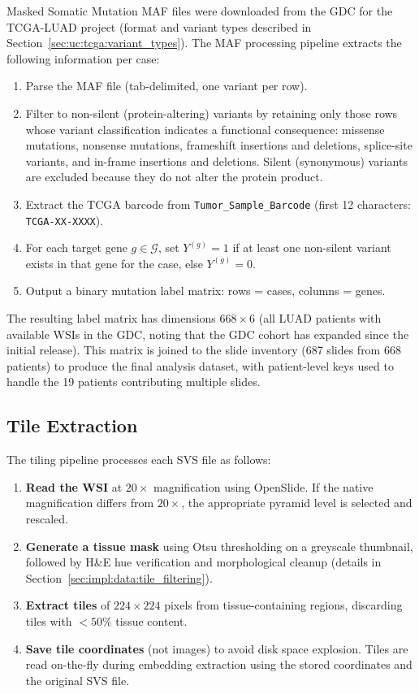 Masked Somatic Mutation MAF files were downloaded from the GDC for the
TCGA-LUAD project (format and variant types described in
Section~\ref{sec:uc:tcga:variant_types}).
The MAF processing pipeline
extracts the following information per case:

\begin{enumerate}
    \item Parse the MAF file (tab-delimited, one variant per row).
    \item Filter to non-silent (protein-altering) variants by retaining
    only those rows whose variant classification indicates a functional
    consequence: missense mutations, nonsense mutations, frameshift
    insertions and deletions, splice-site variants, and in-frame
    insertions and deletions.  Silent (synonymous) variants are
    excluded because they do not alter the protein product.
    \item Extract the TCGA barcode from \texttt{Tumor\_Sample\_Barcode}
    (first 12 characters: \texttt{TCGA-XX-XXXX}).
    \item For each target gene $g \in \mathcal{G}$, set $Y^{(g)} = 1$ if
    at least one non-silent variant exists in that gene for the case,
    else $Y^{(g)} = 0$.
    \item Output a binary mutation label matrix: rows = cases, columns
    = genes.
\end{enumerate}

The resulting label matrix has dimensions $668 \times 6$
(all LUAD patients with available WSIs in the GDC, noting that the
GDC cohort has expanded since the initial release).
This matrix is joined to the slide inventory (687 slides from 668 patients)
to produce the final analysis dataset, with patient-level keys used to
handle the 19 patients contributing multiple slides.

\subsection{Tile Extraction}
\label{sec:impl:data:tiling}

The tiling pipeline processes each SVS file as follows:

\begin{enumerate}
    \item \textbf{Read the WSI} at $20\times$ magnification using OpenSlide.
    If the native magnification differs from $20\times$, the appropriate
    pyramid level is selected and rescaled.
    \item \textbf{Generate a tissue mask} using Otsu thresholding on a
    greyscale thumbnail, followed by H\&E hue verification and
    morphological cleanup (details in
    Section~\ref{sec:impl:data:tile_filtering}).
    \item \textbf{Extract tiles} of $224 \times 224$ pixels from
    tissue-containing regions, discarding tiles with $< 50\%$ tissue
    content.
    \item \textbf{Save tile coordinates} (not images) to avoid disk space
    explosion. Tiles are read on-the-fly during embedding extraction using
    the stored coordinates and the original SVS file.
\end{enumerate}

